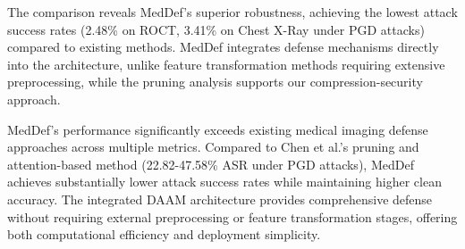 \documentclass[preprint,12pt]{elsarticle}
\begin{document}
\begin{table}[!t]
\caption{COMPARISON WITH STATE-OF-THE-ART ADVERSARIAL DEFENSE METHODS IN MEDICAL IMAGING}
\label{tab:sota_comparison}
\centering
\renewcommand{\arraystretch}{1.2}
\end{table}

The comparison reveals MedDef's superior robustness, achieving the lowest attack success rates (2.48\% on ROCT, 3.41\% on Chest X-Ray under PGD attacks) compared to existing methods. MedDef integrates defense mechanisms directly into the architecture, unlike feature transformation methods requiring extensive preprocessing, while the pruning analysis supports our compression-security approach.

MedDef's performance significantly exceeds existing medical imaging defense approaches across multiple metrics. Compared to Chen et al.'s pruning and attention-based method (22.82-47.58\% ASR under PGD attacks), MedDef achieves substantially lower attack success rates while maintaining higher clean accuracy. The integrated DAAM architecture provides comprehensive defense without requiring external preprocessing or feature transformation stages, offering both computational efficiency and deployment simplicity.
\end{document}
